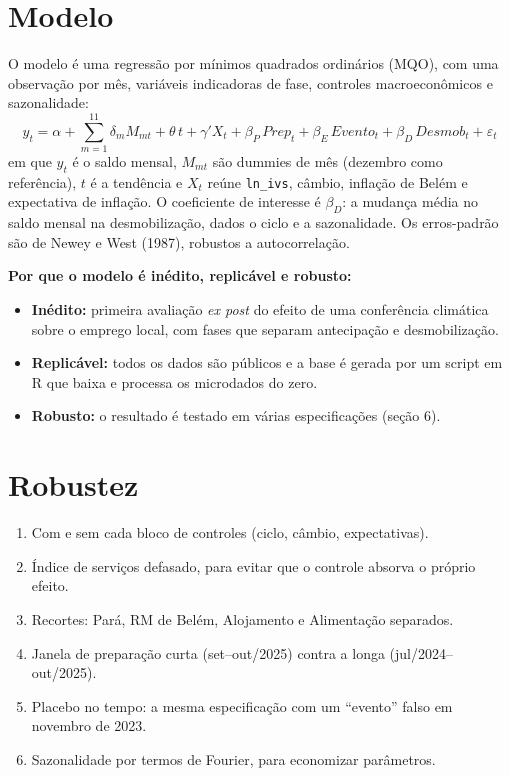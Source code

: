 \documentclass[11pt,a4paper]{article}
\newcommand{\var}[1]{\texttt{#1}}
\begin{document}
\section{Modelo}

O modelo é uma regressão por mínimos quadrados ordinários (MQO), com uma observação por mês, variáveis
indicadoras de fase, controles macroeconômicos e sazonalidade:
\begin{equation}
y_t = \alpha + \sum_{m=1}^{11}\delta_m M_{mt} + \theta\, t + \gamma' X_t
      + \beta_P\, Prep_t + \beta_E\, Evento_t + \beta_D\, Desmob_t + \varepsilon_t
\end{equation}
em que $y_t$ é o saldo mensal, $M_{mt}$ são dummies de mês (dezembro como referência), $t$ é a
tendência e $X_t$ reúne \var{ln\_ivs}, câmbio, inflação de Belém e expectativa de inflação. O
coeficiente de interesse é $\beta_D$: a mudança média no saldo mensal na desmobilização, dados o
ciclo e a sazonalidade. Os erros-padrão são de Newey e West (1987), robustos a autocorrelação.

\textbf{Por que o modelo é inédito, replicável e robusto:}
\begin{itemize}
  \item \textbf{Inédito:} primeira avaliação \textit{ex post} do efeito de uma conferência climática
        sobre o emprego local, com fases que separam antecipação e desmobilização.
  \item \textbf{Replicável:} todos os dados são públicos e a base é gerada por um script em R que baixa
        e processa os microdados do zero.
  \item \textbf{Robusto:} o resultado é testado em várias especificações (seção 6).
\end{itemize}

\section{Robustez}

\begin{enumerate}[leftmargin=*]
  \item Com e sem cada bloco de controles (ciclo, câmbio, expectativas).
  \item Índice de serviços defasado, para evitar que o controle absorva o próprio efeito.
  \item Recortes: Pará, RM de Belém, Alojamento e Alimentação separados.
  \item Janela de preparação curta (set--out/2025) contra a longa (jul/2024--out/2025).
  \item Placebo no tempo: a mesma especificação com um ``evento'' falso em novembro de 2023.
  \item Sazonalidade por termos de Fourier, para economizar parâmetros.
\end{enumerate}
\end{document}
